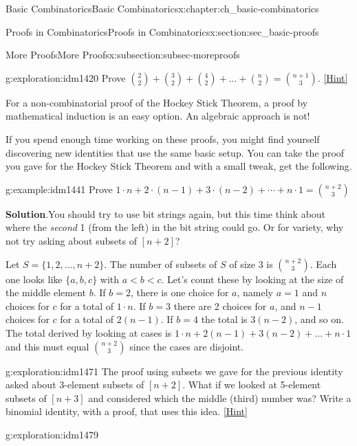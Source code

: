 \documentclass[oneside,10pt,]{book}
\numberwithin{equation}{chapter}
\newcommand{\lt}{<}
\begin{document}
\begin{chapterptx}{Basic Combinatorics}{}{Basic Combinatorics}{}{}{x:chapter:ch_basic-combinatorics}
\begin{sectionptx}{Proofs in Combinatorics}{}{Proofs in Combinatorics}{}{}{x:section:sec_basic-proofs}
\begin{subsectionptx}{More Proofs}{}{More Proofs}{}{}{x:subsection:subsec-moreproofs}
\begin{exploration}{}{g:exploration:idm1420}%
Prove \(\binom{2}{2} + \binom{3}{2} + \binom{4}{2} + \ldots + \binom{n}{2} = \binom{n + 1}{3}\).%
\space\hspace*{0pt}\hfill{\tiny\hyperlink{g:hint:idm1424-back}{[Hint]}}\end{exploration}
For a non-combinatorial proof of the Hockey Stick Theorem, a proof by mathematical induction is an easy option. An algebraic approach is not!%
\par
If you spend enough time working on these proofs, you might find yourself discovering new identities that use the same basic setup.  You can take the proof you gave for the Hockey Stick Theorem and with a small tweak, get the following.%
\begin{example}{}{g:example:idm1441}%
Prove \(1\cdot n + 2 \cdot (n-1) + 3 \cdot (n-2) + \cdots + n \cdot 1 = \binom{n+2}{3}\)%
\par\smallskip%
\noindent\textbf{Solution}.\hypertarget{g:solution:idm1445}{}\quad{}You should try to use bit strings again, but this time think about where the \emph{second} 1 (from the left) in the bit string could go.  Or for variety, why not try asking about subsets of \([n+2]\)?%
\par
Let \(S = \{1,2,\ldots,n + 2\}\). The number of subsets of \(S\) of size 3 is \(\binom{n + 2}{3}\). Each one looks like \(\{a, b, c\}\) with \(a \lt b \lt c\). Let's count these by looking at the size of the middle element \(b\). If \(b=2\), there is one choice for \(a\), namely \(a=1\) and \(n\) choices for \(c\) for a total of \(1 \cdot n\). If \(b=3\) there are 2 choices for \(a\), and \(n - 1\) choices for \(c\) for a total of \(2(n - 1)\). If \(b=4\) the total is \(3(n - 2)\), and so on. The total derived by looking at cases is \(1 \cdot n + 2\left( n - 1 \right) + 3\left( n - 2 \right) + \ldots + n \cdot 1\) and this must equal \(\binom{n + 2}{3}\) since the cases are disjoint.%
\end{example}
\begin{exploration}{}{g:exploration:idm1471}%
The proof using subsets we gave for the previous identity asked about 3-element subsets of \([n+2]\).  What if we looked at 5-element subsets of \([n+3]\) and considered which the middle (third) number was?  Write a binomial identity, with a proof, that uses this idea.%
\space\hspace*{0pt}\hfill{\tiny\hyperlink{g:hint:idm1476-back}{[Hint]}}\end{exploration}
\begin{exploration}{}{g:exploration:idm1479}%

\end{exploration}
\end{subsectionptx}
\end{sectionptx}
\end{chapterptx}
\end{document}
